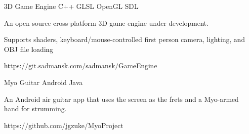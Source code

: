 



\begin{cvprojects}

\cvproject
{3D Game Engine}
{C++ \textbullet{} GLSL \textbullet{} OpenGL \textbullet{} SDL}
{
An open source cross-platform 3D game engine under development.
\begin{cvitems}
\item[]
\item {Supports shaders, keyboard/mouse-controlled first person camera, lighting, and OBJ file loading}
\end{cvitems}
}
{https://git.sadmansk.com/sadmansk/GameEngine}


\cvproject
{Myo Guitar}
{Android \textbullet{} Java}
{
An Android air guitar app that uses the screen as the frets and a Myo-armed hand for strumming.
    \begin{cvitems}\end{cvitems} %
}
{https://github.com/jgzuke/MyoProject}


\end{cvprojects}
